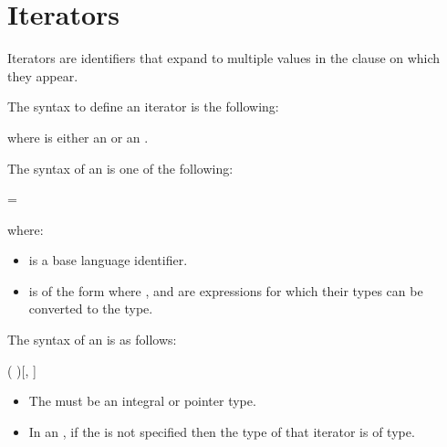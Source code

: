 \section{Iterators}
\label{sec:iterators}

Iterators are identifiers that expand to multiple values in the clause on which they appear.

The syntax to define an iterator is the following:
\begin{ompSyntax}
\end{ompSyntax}
where  is either an  or an .

The syntax of an  is one of the following:
\begin{indentedcodelist}
  = 
\end{indentedcodelist}

where:
\begin{itemize}
\item {} is a base language identifier.

\item {} is of the form  where ,  and  are expressions for which their types can be converted to the  type.
\end{itemize}

The syntax of an  is as follows:
\begin{indentedcodelist}
(  )[, ]
\end{indentedcodelist}


\begin{ccppspecific}
\begin{itemize}
\item The  must be an integral or pointer type.
\item In an , if the  is not specified then the type of that iterator is of  type.
\end{itemize}
\end{ccppspecific}

